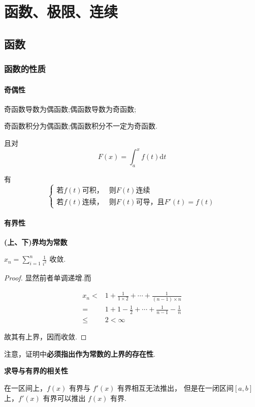 \chapter{函数、极限、连续}
\section{函数}
\subsection{函数的性质}
\subsubsection{奇偶性}
奇函数导数为偶函数;偶函数导数为奇函数;

奇函数积分为偶函数;偶函数积分不一定为奇函数.

且对
$$
    F(x)=\int^{x}_{a}f(t)\textrm{d}t
$$ 

有
$$
    \begin{cases}
    \textrm{若}f(t)\textrm{可积，}& \textrm{则}F(t)\textrm{连续}\\
    \textrm{若}f(t)\textrm{连续，}& \textrm{则}F(t)\textrm{可导，且}F'(t)=f(t)
    \end{cases}
$$ 

\subsubsection{有界性}
\noindent\textbf{(上、下)界均为常数}
\newline

$
    x_{n}=\displaystyle\sum^{n}_{i=1}\frac{1}{i^{2}}
$
收敛.

\begin{proof}
显然前者单调递增.而

\begin{align*}
    x_{n}<{}&1+\frac{1}{1\times2}+\cdots+\frac{1}{(n-1)\times n}\\
    ={}&1+1-\frac{1}{2}+\cdots+\frac{1}{n-1}-\frac{1}{n}\\
    \leq{}&2<\infty
\end{align*}

故其有上界，因而收敛.
\end{proof}

注意，证明中\textbf{必须指出作为常数的上界的存在性}.

\noindent\textbf{求导与有界的相关性}\newline

在一区间上，$ f(x) $ 有界与 $ f'(x) $ 有界相互无法推出，
但是在一闭区间$ [a,b] $ 上，$ f'(x) $ 有界可以推出 $ f(x) $ 有界.

